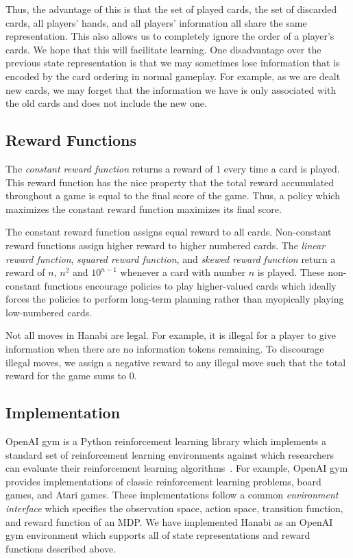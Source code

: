 Thus, the advantage of this is that the set of played cards, the set of
discarded cards, all players' hands, and all players' information all share the
same representation. This also allows us to completely ignore the order of a
player's cards. We hope that this will facilitate learning. One disadvantage
over the previous state representation is that we may sometimes lose
information that is encoded by the card ordering in normal gameplay. For
example, as we are dealt new cards, we may forget that the information we have
is only associated with the old cards and does not include the new one.

\subsection{Reward Functions}
The \emph{constant reward function} returns a reward of $1$ every time a card
is played. This reward function has the nice property that the total reward
accumulated throughout a game is equal to the final score of the game. Thus, a
policy which maximizes the constant reward function maximizes its final score.

The constant reward function assigns equal reward to all cards. Non-constant
reward functions assign higher reward to higher numbered cards. The
\emph{linear reward function}, \emph{squared reward function}, and \emph{skewed
reward function} return a reward of $n$, $n^2$ and $10^{n-1}$ whenever a card
with number $n$ is played. These non-constant functions encourage policies to
play higher-valued cards which ideally forces the policies to perform long-term
planning rather than myopically playing low-numbered cards.

Not all moves in Hanabi are legal. For example, it is illegal for a player to
give information when there are no information tokens remaining. To discourage
illegal moves, we assign a negative reward to any illegal move such that the
total reward for the game sums to 0.


\subsection{Implementation}
OpenAI gym is a Python reinforcement learning library which implements a
standard set of reinforcement learning environments against which researchers
can evaluate their reinforcement learning algorithms~\cite{brockman2016openai}.
For example, OpenAI gym provides implementations of classic reinforcement
learning problems, board games, and Atari games. These implementations follow a
common \emph{environment interface} which specifies the observation space,
action space, transition function, and reward function of an MDP. We have
implemented Hanabi as an OpenAI gym environment which supports all of state
representations and reward functions described above.

